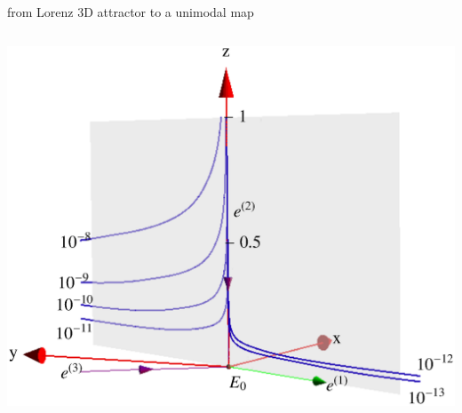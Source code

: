 \documentclass{beamer}
\begin{document}
\begin{frame}{from Lorenz 3D attractor to a unimodal map}
\begin{columns}[t]
{\begin{block}{}
			 \hspace{-0.2\textwidth}\includegraphics[width=1.2\textwidth,clip=true]
            {../../figs/lorenzSaddle0}
			\end{block}
		}
\end{columns}
\end{frame}
\end{document}
